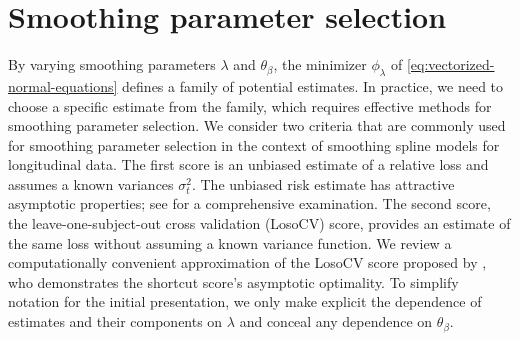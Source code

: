 


\section{Smoothing parameter selection} \label{SSANOVA-smoothing-parameter-selection}
%
%

By varying smoothing parameters $\lambda$ and $\theta_\beta$, the minimizer $\phi_\lambda$ of \ref{eq:vectorized-normal-equations} defines a family of potential estimates. In practice, we need to choose a specific estimate from the family, which requires effective methods for smoothing parameter selection. We consider two criteria that are commonly used for smoothing parameter selection in the context of smoothing spline models for longitudinal data. The first score is an unbiased estimate of a relative loss and assumes a known variances $\sigma_t^2$. The unbiased risk estimate has attractive asymptotic properties; see \cite{gu2013smoothing} for a comprehensive examination. The second score, the leave-one-subject-out cross validation (LosoCV) score, provides an estimate of the same loss without assuming a known variance function. We review a computationally convenient approximation of the LosoCV score proposed by \cite{xu2012asymptotic}, who demonstrates the shortcut score's asymptotic optimality. To simplify notation for the initial presentation, we only make explicit the dependence of estimates and their components on $\lambda$ and conceal any dependence on $\theta_\beta$. 


